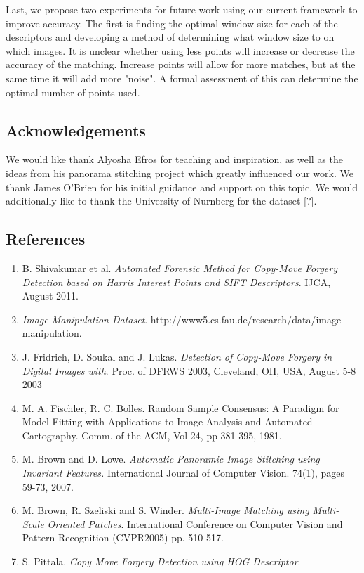 \documentclass[12pt]{article}
\begin{document}
Last, we propose two experiments for future work using our current framework to improve accuracy. The first is finding the optimal window size for each of the descriptors and developing a method of determining what window size to on which images. It is unclear whether using less points will increase or decrease the accuracy of the matching. Increase points will allow for more matches, but at the same time it will add more "noise". A formal assessment of this can determine the optimal number of points used. 

\subsection*{Acknowledgements}

We would like thank Alyosha Efros for teaching and inspiration, as well as the ideas from his panorama stitching project which greatly influenced our work. We thank James O'Brien for his initial guidance and support on this topic. We would additionally like to thank the University of Nurnberg for the dataset [?].

\subsection*{References}

\begin{enumerate}
\item B. Shivakumar et al. {\it Automated Forensic Method for Copy-Move Forgery Detection based on Harris Interest Points and SIFT Descriptors}. IJCA, August 2011. 
\item {\it Image Manipulation Dataset}. http://www5.cs.fau.de/research/data/image-manipulation. 
\item J. Fridrich, D. Soukal and J. Lukas. {\it Detection of Copy-Move Forgery in Digital Images with}. Proc. of DFRWS 2003, Cleveland, OH, USA, August 5-8 2003
\item M. A. Fischler, R. C. Bolles. Random Sample Consensus: A Paradigm for Model Fitting with Applications to Image Analysis and Automated Cartography. Comm. of the ACM, Vol 24, pp 381-395, 1981. 
\item M. Brown and D. Lowe. {\it Automatic Panoramic Image Stitching using Invariant Features.} International Journal of Computer Vision. 74(1), pages 59-73, 2007.
\item M. Brown, R. Szeliski and S. Winder. {\it Multi-Image Matching using Multi-Scale Oriented Patches}. International Conference on Computer Vision and Pattern Recognition (CVPR2005) pp. 510-517.
\item S. Pittala. {\it Copy Move Forgery Detection using HOG Descriptor}.
\end{enumerate}
\end{document}
